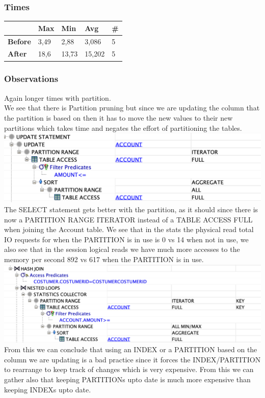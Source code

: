 \documentclass[a4paper, 10pt]{article}
\begin{document}
\subsubsection{Times}
\begin{table}[H]
\begin{tabular}{l|l|l|l|l|}
\cline{2-5}
\textbf{}                             & \textbf{Max} & \textbf{Min} & \textbf{Avg} & \textbf{\#}  \\ \hline
\multicolumn{1}{|l|}{\textbf{Before}} & 3,49          & 2,88          & 3,086          & 5            \\ \hline
\multicolumn{1}{|l|}{\textbf{After}}  & 18,6         & 13,73         & 15,202          & 5            \\ \hline
\end{tabular}
\end{table}
\subsubsection{Observations}
Again longer times with partition.\\
We see that there is Partition pruning but since we are updating the column that the partition is based on then it has to move the new values to their new partitions which takes time and negates the effort of partitioning the tables.\\
\includegraphics[width=\textwidth,height=\textheight,keepaspectratio]{2update}\\ 
The SELECT statement gets better with the partition, as it should since there is now a PARTITION RANGE ITERATOR instead of a TABLE ACCESS FULL when joining the Account table. We see that in the stats the physical read total IO requests for when the PARTITION is in use is 0 vs 14 when not in use, we also see that in the session logical reads we have much more accesses to the memory per second 892 vs 617 when the PARTITION is in use.\\
\includegraphics[width=\textwidth,height=\textheight,keepaspectratio]{2Select}\\
From this we can conclude that using an INDEX or a PARTITION based on the column we are updating is a bad practice since it forces the INDEX/PARTITION to rearrange to keep track of changes which is very expensive. From this we can gather also that keeping PARTITIONs upto date is much more expensive than keeping INDEXs upto date.\\
\end{document}
